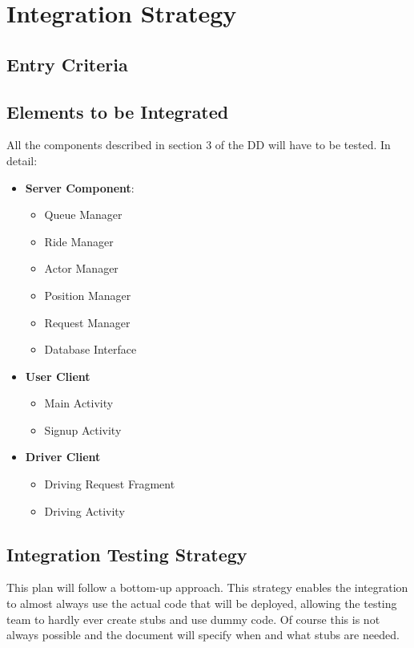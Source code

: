 \section{Integration Strategy} %
\label{sec:integration_strategy}

\subsection{Entry Criteria} %
\label{sub:entry_criteria}

\subsection{Elements to be Integrated} %
\label{sub:elements_to_be_integrated}
All the components described in section 3 of the DD will have to be tested.
In detail:
\begin{itemize}
	\item \textbf{Server Component}:
	\begin{itemize}
		\item Queue Manager
		\item Ride Manager
		\item Actor Manager
		\item Position Manager
		\item Request Manager
		\item Database Interface
	\end{itemize}
	\item \textbf{User Client}
	\begin{itemize}
		\item Main Activity
		\item Signup Activity
	\end{itemize}
	\item \textbf{Driver Client}
	\begin{itemize}
		\item Driving Request Fragment
		\item Driving Activity
	\end{itemize}
\end{itemize}

\subsection{Integration Testing Strategy} %
\label{sub:integration_testing_strategy}
This plan will follow a bottom-up approach. This strategy enables the integration to almost always use the actual code that will be deployed, allowing the testing team to hardly ever create stubs and use dummy code.
Of course this is not always possible and the document will specify when and what stubs are needed.

